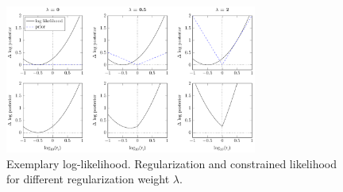 \documentclass{bioinfo}
\begin{document}
\begin{figure}[!tpb]%
\centerline{\includegraphics[width=235pt]{Figures/l1_cartoon_priorstrength.pdf}}
\caption{Exemplary log-likelihood. Regularization and constrained likelihood for different regularization weight $\lambda$.}\label{fig:01}
\end{figure}
\end{document}

